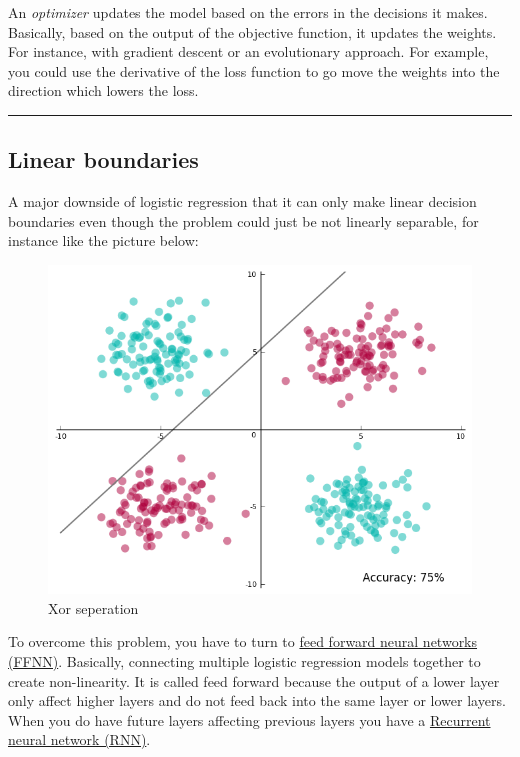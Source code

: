 \documentclass[
  11pt,
  british,
]{article}
\begin{document}
An \emph{optimizer} updates the model based on the errors in the
decisions it makes. Basically, based on the output of the objective
function, it updates the weights. For instance, with gradient descent or
an evolutionary approach. For example, you could use the derivative of
the loss function to go move the weights into the direction which lowers
the loss.

\begin{center}\rule{0.5\linewidth}{0.5pt}\end{center}

\hypertarget{linear-boundaries}{%
\subsection{Linear boundaries}\label{linear-boundaries}}

A major downside of logistic regression that it can only make linear
decision boundaries even though the problem could just be not linearly
separable, for instance like the picture below:

\begin{figure}
\centering
\includegraphics{Pasted_image_20220603200910.png}
\caption{Xor seperation}
\end{figure}

To overcome this problem, you have to turn to
\href{../Prediction/Feed\%20forward\%20neural\%20networks\%20(FFNN).md}{feed
forward neural networks (FFNN)}. Basically, connecting multiple logistic
regression models together to create non-linearity. It is called feed
forward because the output of a lower layer only affect higher layers
and do not feed back into the same layer or lower layers. When you do
have future layers affecting previous layers you have a
\href{../Prediction/Recurrent\%20neural\%20network\%20(RNN).md}{Recurrent
neural network (RNN)}.
\end{document}
